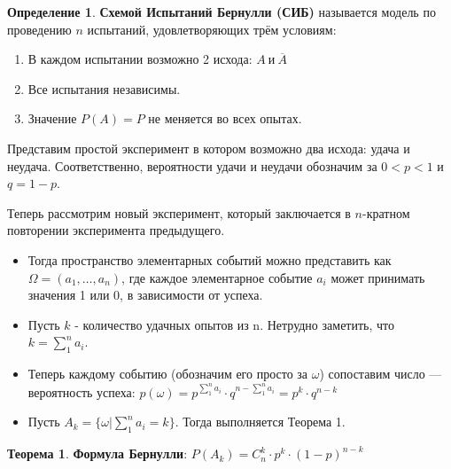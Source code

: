 \documentclass[a4paper, 12pt]{article}
\theoremstyle{definition}
\newtheorem{Definition}{Определение}
\newtheorem{Thm}{Теорема}
\begin{document}
    \begin{Definition}
        \textbf{Схемой Испытаний Бернулли (СИБ)} называется модель по проведению \(n\) испытаний, удовлетворяющих трём условиям:
            \begin{enumerate}
                \item
                    В каждом испытании возможно 2 исхода: \(A\  \text{и} \ \overline{A} \)
                \item
                    Все испытания независимы.
                \item
                    Значение \(P(A) = P\) не меняется во всех опытах. 
            \end{enumerate}

            Представим простой эксперимент в котором возможно два исхода: удача и неудача. Соответственно, вероятности удачи и неудачи обозначим за \(0 < p < 1\) и \(q = 1 - p\).

            Теперь рассмотрим новый эксперимент, который заключается в \(n\)-кратном повторении эксперимента предыдущего.
            \begin{itemize}
                \item
                    Тогда пространство элементарных событий можно представить как \(\Omega = (a_1, \ldots, a_n)\), где каждое элементарное событие \(a_i\) может принимать значения 1 или 0, в зависимости от успеха.
                \item
                    Пусть \(k\) - количество удачных опытов из n. Нетрудно заметить, что \(k = \sum^{n}_{1} a_i\).
                \item
                    Теперь каждому событию (обозначим его просто за \(\omega\)) сопоставим число --- вероятность успеха: \(p(\omega) = p^{\sum^{n}_{1} a_i} \cdot q^{n - {\sum^{n}_{1} a_i}} = p^k \cdot q^{n - k} \)
                \item
                    Пусть \(A_k = \{\omega| \sum^{n}_{1} a_i = k\} \). Тогда выполняется Теорема 1.
            \end{itemize}
    \end{Definition}

    \newpage

    \begin{Thm}
        \textbf{Формула Бернулли}: \(P(A_k) = C^{k}_{n} \cdot p^k \cdot (1 - p)^{n - k}\)
    \end{Thm}
\end{document}
